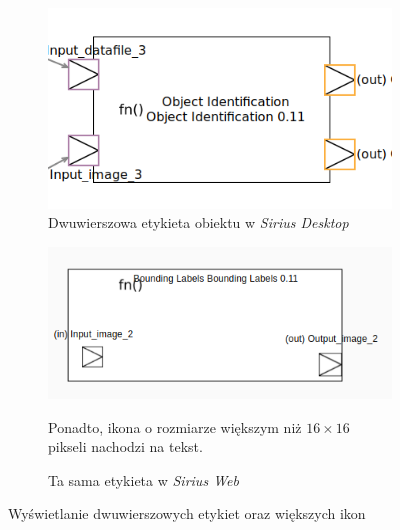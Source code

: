 \begin{figure}
	\centering
	\begin{subfigure}{.49\textwidth}
		\centering
    \includegraphics[width=.99\linewidth]{./images/sirius-desktop-multiline-label.png}
		\caption{Dwuwierszowa etykieta obiektu w \emph{Sirius Desktop}}
	\end{subfigure}
	\begin{subfigure}{.49\textwidth}
		\centering
		\includegraphics[width=.99\linewidth]{./images/sirius-web-multiline-label.png}
		\caption{Ta sama etykieta w \emph{Sirius Web}}\label{rys:border-node-sirius-web}
    \medskip
    {\footnotesize Ponadto, ikona o rozmiarze większym niż $16\times16$ pikseli nachodzi na tekst.}
	\end{subfigure}

    \caption{Wyświetlanie dwuwierszowych
      etykiet oraz większych ikon}\label{rys:sirius-multiline-labels}
\end{figure}

